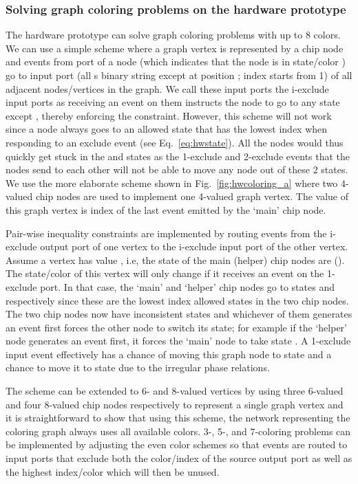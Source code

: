 \documentclass[10pt]{article}
\begin{document}
\subsubsection*{Solving graph coloring problems on the hardware prototype}
The hardware prototype can solve graph coloring problems with up to 8 colors. We can use a simple scheme where a graph vertex is represented by a chip node and events from port  of a node (which indicates that the node is in state/color ) go to input port  (all s binary string except at position ;  index starts from 1) of all adjacent nodes/vertices in the graph. We call these input ports the i-exclude input ports as receiving an event on them instructs the node to go to any state except , thereby enforcing the constraint. However, this scheme will not work since a node always goes to an allowed state that has the lowest index when responding to an exclude event (see Eq.~\ref{eq:hwstate}). All the nodes would thus quickly get stuck in the  and  states as the 1-exclude and 2-exclude events that the nodes send to each other will not be able to move any node out of these 2 states. We use the more elaborate scheme shown in Fig.~\ref{fig:hwcoloring_a} where two 4-valued chip nodes are used to implement one 4-valued graph vertex. The value of this graph vertex is index of the last event emitted by the `main' chip node. 

Pair-wise inequality constraints are implemented by routing events from the i-exclude output port of one vertex to the i-exclude input port of the other vertex. Assume a vertex has value , i.e, the state of the main (helper) chip nodes are  (). The state/color of this vertex will only change if it receives an event on the 1-exclude port. In that case, the `main' and `helper' chip nodes go to states  and  respectively  since these are the lowest index allowed states in the two chip nodes. The two chip nodes now have inconsistent states and whichever of them generates an event first forces the other node to switch its state; for example if the `helper' node generates an event first, it forces the `main' node to take state . A 1-exclude input event effectively has a  chance of moving this graph node to state  and a  chance to move it to state  due to the irregular phase relations.

The scheme can be extended to 6- and 8-valued vertices by using three 6-valued and four 8-valued chip nodes respectively to represent a single graph vertex and it is straightforward to show that using this scheme, the network representing the coloring graph always uses all available colors. 3-, 5-, and 7-coloring problems can be implemented by adjusting the even color schemes so that events are routed to input ports that exclude both the color/index of the source output port as well as the highest index/color which will then be unused. 
\end{document}
